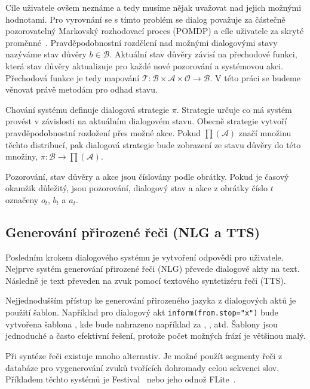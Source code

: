 Cíle uživatele ovšem neznáme a tedy musíme nějak uvažovat nad jejich možnými hodnotami.
Pro vyrovnání se s tímto problém se dialog považuje za částečně pozorovatelný Markovský rozhodovací proces (POMDP) a cíle uživatele za skryté proměnné~\cite{williams2007partially}.
Pravděpodobnostní rozdělení nad možnými dialogovými stavy nazýváme stav důvěry $b \in \mathcal{B}$.
Aktuální stav důvěry závisí na přechodové funkci, která stav důvěry aktualizuje pro každé nové pozorování a systémovou akci.
Přechodová funkce je tedy mapování $\mathcal{T} : \mathcal{B} \times \mathcal{A} \times \mathcal{O} \longrightarrow \mathcal{B}$.
V této práci se budeme věnovat právě metodám pro odhad stavu.

Chování systému definuje dialogová strategie $\pi$.
Strategie určuje co má systém provést v závislosti na aktuálním dialogovém stavu.
Obecně strategie vytvoří pravděpodobnostní rozložení přes možné akce.
Pokud $\prod(\mathcal{A})$ značí množinu těchto distribucí, pak dialogová strategie bude zobrazení ze stavu důvěry do této množiny, $\pi: \mathcal{B} \longrightarrow \prod(\mathcal{A})$.

Pozorování, stav důvěry a akce jsou číslovány podle obrátky.
Pokud je časový okamžik důležitý, jsou pozorování, dialogový stav a akce z obrátky číslo $t$ označeny $o_t$, $b_t$ a $a_t$.

\subsection{Generování přirozené řeči (NLG a TTS)}

Posledním krokem dialogového systému je vytvoření odpovědi pro uživatele.
Nejprve systém generování přirozené řeči (NLG) převede dialogové akty na text.
Následně je text převeden na zvuk pomocí textového syntetizéru řeči (TTS).

Nejjednodušším přístup ke generování přirozeného jazyka z dialogových aktů je použití šablon.
Například pro dialogový akt {\tt inform(from.stop="x")} bude vytvořena šablona , kde  bude nahrazeno například za , , atd.
Šablony jsou jednoduché a často efektivní řešení, protože počet možných frází je většinou malý.

Při syntéze řeči existuje mnoho alternativ.
Je možné použít segmenty řeči z databáze pro vygenerování zvuků tvořících dohromady celou sekvenci slov.
Příkladem těchto systémů je Festival~\cite{black2001festival} nebo jeho odnož  FLite~\cite{black2001flite}.

